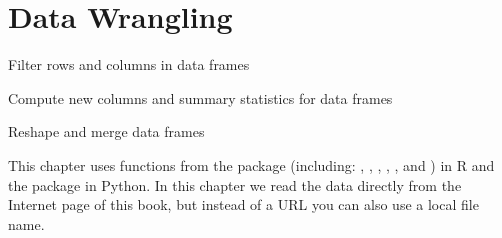 \chapter{Data Wrangling}
\label{chap:datawrangling}

\begin{abstract}{Abstract}
This chapter shows you how to do `data wrangling' in R and Python.
Data wrangling is the process of transforming raw data into a shape that is suitable for analysis. The sections of this chapter first take you through the normal data wrangling pipeline of
filtering, changing, grouping, and joining data. Finally, the last section shows how you can
reshape data.
\end{abstract}


\begin{objectives}
\item Filter rows and columns in data frames
\item Compute new columns and summary statistics for data frames
\item Reshape and merge data frames
\end{objectives}

\begin{feature}
  This chapter uses functions from the package  (including: , , , , ,  and ) in R and the package  in Python. In this chapter we read the data directly from the Internet page of this book, but instead of a URL you can also use a local file name.
\end{feature}






